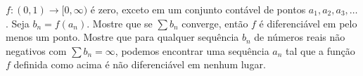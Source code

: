 \(f\colon  (0,1) \to [0, \infty)\) é zero, exceto em um conjunto contável de pontos \(a_{1}, a_2, a_3, \dots\). Seja \(b_n = f(a_n)\). Mostre que se \(\sum b_{n}\) converge, então \(f\) é diferenciável em pelo menos um ponto. Mostre que para qualquer sequência \(b_{n}\) de números reais não negativos com \(\sum b_{n} = \infty\), podemos encontrar uma sequência \(a_{n}\) tal que a função \(f\) definida como acima é não diferenciável em nenhum lugar.

